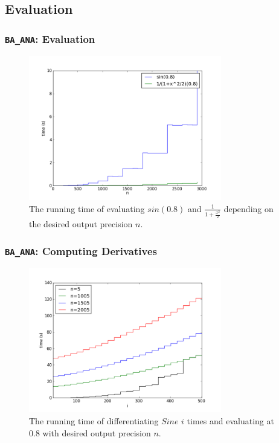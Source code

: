 \documentclass[xcolor=pdftex,dvipsnames,table]{beamer}
\newcommand{\code}[1]{\texttt{#1}}
\begin{document}
\subsection{Evaluation}
\begin{frame}
\frametitle{\code{BA\_ANA}: Evaluation}
\begin{figure}[h!]
\centering
\includegraphics[width=0.75\textwidth]{bana_n}
  \caption{The running time of evaluating $sin(0.8)$ and $\frac 1 {1+\frac{x^2}{2}}$ depending on the desired output precision $n$.}
\end{figure}
\end{frame}
\begin{frame}
\frametitle{\code{BA\_ANA}: Computing Derivatives}
\begin{figure}[h!]
\centering
\includegraphics[width=0.75\textwidth]{ddxbana_i}
  \caption{The running time of differentiating $Sine$ $i$ times and evaluating at $0.8$ with desired output precision $n$.}
\end{figure}
\end{frame}
\end{document}
